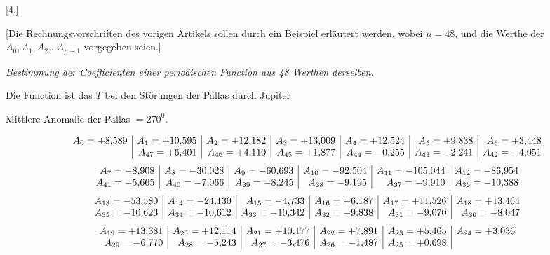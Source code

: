 \clearpage
\begin{landscape}
\begingroup
\fontsize{9.5}{12}\selectfont
{}
\renewcommand{\headrulewidth}{0pt}
\setlength{\lineskip}{4pt}\setlength{\lineskiplimit}{4pt}
\setlength{\arraycolsep}{4pt}
\begin{center}[4.]\end{center}
\par\noindent\hspace*{\parindent}[Die Rechnungsvorschriften des vorigen Artikels sollen durch ein Beispiel erläutert werden, wobei \(\mu=48\), und die Werthe der \(A_0, A_1, A_2\ldots A_{\mu-1}\) vorgegeben seien.]
\begin{center}
\textit{Bestimmung der Coefficienten einer periodischen Function aus 48 Werthen derselben.}\par
\medskip
Die Function ist das \(T\) bei den Störungen der Pallas durch Jupiter\par
Mittlere Anomalie der Pallas \(=270^0\).
\end{center}
\[
\begin{array}{@{}r|r|r|r|r|r|r@{}}
A_0=+8{,}589&A_1=+10{,}595&A_2=+12{,}182&A_3=+13{,}009&A_4=+12{,}524&A_5=+9{,}838&A_6=+3{,}448\\
&A_{47}=+6{,}401&A_{46}=+4{,}110&A_{45}=+1{,}877&A_{44}=-0{,}255&A_{43}=-2{,}241&A_{42}=-4{,}051
\end{array}
\]
\[
\begin{array}{@{}r|r|r|r|r|r@{}}
A_7=-8{,}908&A_8=-30{,}028&A_9=-60{,}693&A_{10}=-92{,}504&A_{11}=-105{,}044&A_{12}=-86{,}954\\
A_{41}=-5{,}665&A_{40}=-7{,}066&A_{39}=-8{,}245&A_{38}=-9{,}195&A_{37}=-9{,}910&A_{36}=-10{,}388
\end{array}
\]
\[
\begin{array}{@{}r|r|r|r|r|r@{}}
A_{13}=-53{,}580&A_{14}=-24{,}130&A_{15}=-4{,}733&A_{16}=+6{,}187&A_{17}=+11{,}526&A_{18}=+13{,}464\\
A_{35}=-10{,}623&A_{34}=-10{,}612&A_{33}=-10{,}342&A_{32}=-9{,}838&A_{31}=-9{,}070&A_{30}=-8{,}047
\end{array}
\]
\[
\begin{array}{@{}r|r|r|r|r|r@{}}
A_{19}=+13{,}381&A_{20}=+12{,}114&A_{21}=+10{,}177&A_{22}=+7{,}891&A_{23}=+5{,}465&A_{24}=+3{,}036\\
A_{29}=-6{,}770&A_{28}=-5{,}243&A_{27}=-3{,}476&A_{26}=-1{,}487&A_{25}=+0{,}698&
\end{array}
\]
\end{landscape}
